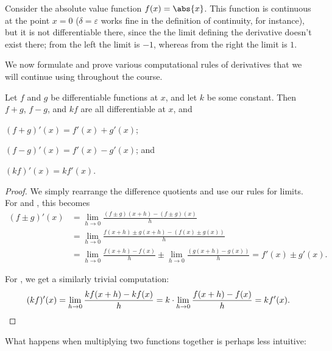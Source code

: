 \begin{counterexample}
	Consider the absolute value function $f(x) = \abs{x}$.
	This function is continuous at the point $x = 0$ ($\delta = \varepsilon$ works fine in the definition of continuity, for instance), but it is not differentiable there, since the the limit defining the derivative doesn't exist there; from the left the limit is $-1$, whereas from the right the limit is $1$.
\end{counterexample}

\noindent
We now formulate and prove various computational rules of derivatives that we will continue using throughout the course.

\begin{theorem}
	Let $f$ and $g$ be differentiable functions at $x$, and let $k$ be some constant.
	Then $f + g$, $f - g$, and $k f$ are all differentiable at $x$, and
	\begin{romanlist}
		\item $(f + g)'(x) = f'(x) + g'(x)$;
		\item $(f - g)'(x) = f'(x) - g'(x)$; and
		\item $(k f)'(x) = k f'(x)$.
	\end{romanlist}
\end{theorem}

\begin{proof}
	We simply rearrange the difference quotients and use our rules for limits.
	For  and , this becomes
	\begin{align*}
		(f \pm g)'(x) & = \lim_{h \to 0} \frac{(f \pm g)(x + h) - (f \pm g)(x)}{h}                                                   \\
		              & = \lim_{h \to 0} \frac{f(x + h) \pm g(x + h) - (f(x) \pm g(x))}{h}                                           \\
		              & = \lim_{h \to 0} \frac{f(x + h) - f(x)}{h} \pm \lim_{h \to 0} \frac{(g(x + h) - g(x))}{h} = f'(x) \pm g'(x).
	\end{align*}

	\noindent
	For , we get a similarly trivial computation:
	\[
		(k f)'(x) = \lim_{h \to 0} \frac{k f(x + h) - k f(x)}{h} = k \cdot \lim_{h \to 0} \frac{f(x + h) - f(x)}{h} = k f'(x). \qedhere
	\]
\end{proof}

\noindent
What happens when multiplying two functions together is perhaps less intuitive:

